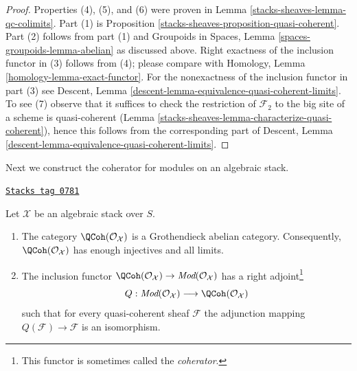 \begin{proof}
Properties (4), (5), and (6) were proven in
Lemma \ref{stacks-sheaves-lemma-qc-colimits}.
Part (1) is
Proposition \ref{stacks-sheaves-proposition-quasi-coherent}.
Part (2) follows from part (1) and
Groupoids in Spaces, Lemma \ref{spaces-groupoids-lemma-abelian}
as discussed above. Right exactness of the inclusion functor
in (3) follows from (4); please compare with
Homology, Lemma \ref{homology-lemma-exact-functor}.
For the nonexactness of the inclusion functor in part (3) see
Descent, Lemma \ref{descent-lemma-equivalence-quasi-coherent-limits}.
To see (7) observe that it suffices to check the restriction
of $\mathcal{F}_2$ to the big site of a scheme is quasi-coherent
(Lemma \ref{stacks-sheaves-lemma-characterize-quasi-coherent}),
hence this follows from the corresponding part of
Descent, Lemma \ref{descent-lemma-equivalence-quasi-coherent-limits}.
\end{proof}

Next we construct the coherator for modules on an algebraic stack.

\begin{proposition}[Coherator]
\label{stacks-sheaves-proposition-coherator}
\href{https://stacks.math.columbia.edu/tag/0781}{\texttt{Stacks tag 0781}}

Let $\mathcal{X}$ be an algebraic stack over $S$.
\begin{enumerate}
\item The category $\QCoh(\mathcal{O}_\mathcal{X})$ is a Grothendieck
abelian category. Consequently, $\QCoh(\mathcal{O}_\mathcal{X})$
has enough injectives and all limits.
\item The inclusion functor
$\QCoh(\mathcal{O}_\mathcal{X}) \to
\textit{Mod}(\mathcal{O}_\mathcal{X})$ has a right adjoint\footnote{This
functor is sometimes called the {\it coherator}.}
$$
Q :
\textit{Mod}(\mathcal{O}_\mathcal{X})
\longrightarrow
\QCoh(\mathcal{O}_\mathcal{X})
$$
such that for every quasi-coherent sheaf $\mathcal{F}$ the adjunction mapping
$Q(\mathcal{F}) \to \mathcal{F}$ is an isomorphism.
\end{enumerate}
\end{proposition}

